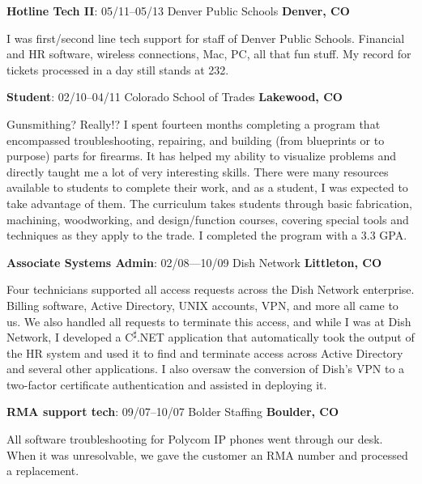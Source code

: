\documentclass[letterpaper,12pt]{article}
\begin{document}
\begin{flushleft}
\textbf{Hotline Tech II}: 05/11--05/13 Denver Public Schools \textbf{Denver, CO}
\end{flushleft}

I was first/second line tech support for staff of Denver Public Schools.
Financial and HR software, wireless connections, Mac, PC, all that fun stuff.
My record for tickets processed in a day still stands at 232.

\begin{flushleft}
\textbf{Student}: 02/10--04/11 Colorado School of Trades \textbf{Lakewood, CO}
\end{flushleft}

Gunsmithing? Really!? I spent fourteen months completing a program that
encompassed troubleshooting, repairing, and building (from blueprints or to
purpose) parts for firearms. It has helped my ability to visualize problems
and directly taught me a lot of very interesting skills. There were many
resources available to students to complete their work, and as a student, I
was expected to take advantage of them. The curriculum takes students through
basic fabrication, machining, woodworking, and design/function courses,
covering special tools and techniques as they apply to the trade. I completed
the program with a 3.3 GPA.

\newpage
\begin{flushleft}
\textbf{Associate Systems Admin}: 02/08---10/09 Dish Network
\textbf{Littleton, CO}
\end{flushleft}

Four technicians supported all access requests across the Dish Network
enterprise. Billing software, Active Directory, UNIX accounts, VPN, and more
all came to us. We also handled all requests to terminate this access, and
while I was at Dish Network, I developed a C\textsuperscript{{$\sharp$}}.NET
application that automatically took the output of the HR system and used it to
find and terminate access across Active Directory and several other
applications. I also oversaw the conversion of Dish's VPN to a two-factor
certificate authentication and assisted in deploying it.

\begin{flushleft}
\textbf{RMA support tech}: 09/07--10/07 Bolder Staffing \textbf{Boulder, CO}
\end{flushleft}

All software troubleshooting for Polycom IP phones went through our desk. When
it was unresolvable, we gave the customer an RMA number and processed a
replacement.
\end{document}
